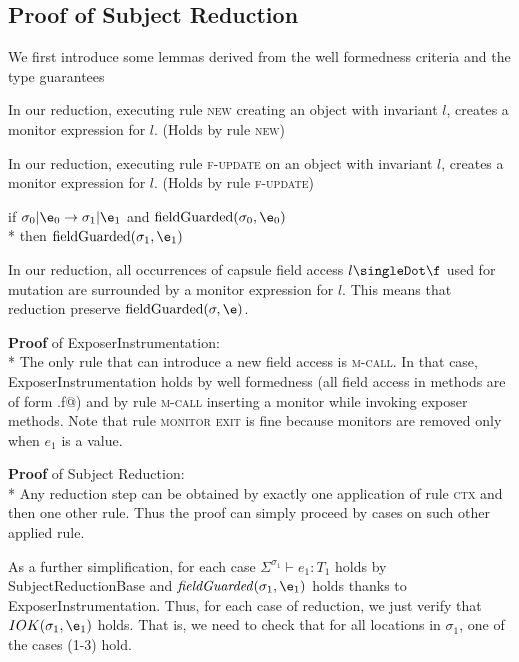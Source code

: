 \subsection{Proof of Subject Reduction}
We first introduce some lemmas
derived from the well formedness criteria and the type guarantees
\begin{Lemma}[ConstructorInstrumentation]
  In our reduction, executing rule \textsc{new} creating an object with invariant $l$, creates a monitor expression for $l$.
(Holds by rule \textsc{new})
\end{Lemma}
\begin{Lemma}[SetterInstrumentation]
  In our reduction, executing rule \textsc{f-update} on an object with invariant $l$, creates a monitor expression for $l$.
(Holds by rule \textsc{f-update})
\end{Lemma}
\begin{Lemma}[ExposerInstrumentation]
if $\sigma_0 | \e_0\rightarrow \sigma_1 |\e_1$ and
$\text{fieldGuarded}(\sigma_0,\e_0)$
\\*
then $\text{fieldGuarded}(\sigma_1,\e_1)$

  In our reduction, all occurrences of capsule field access $l\singleDot\f$ used for mutation
   are surrounded by a monitor expression for $l$.
  This means that reduction preserve $\text{fieldGuarded}(\sigma,\e)$.
\end{Lemma}
\noindent\textbf{Proof }of ExposerInstrumentation:\\*
The only rule that can 
introduce a new field access is \textsc{m-call}.
In that case, ExposerInstrumentation holds
by well formedness (all field access in methods are of form \Q@this.f@) 
and by rule \textsc{m-call} inserting a monitor while invoking exposer methods.
Note that rule \textsc{monitor exit} is fine because monitors are removed only when
 $e_1$ is a value.

\noindent\textbf{Proof }of Subject Reduction:\\*
Any reduction step can be obtained
by exactly one application of rule \textsc{ctx} and then one other rule.
Thus the proof can simply proceed by cases on such other applied rule.

As a further simplification, for each case 
$\Sigma^{\sigma_1}\vdash e_1: T_1$ holds by SubjectReductionBase
and 
$\mathit{fieldGuarded}(\sigma_1,\e_1)$ 
holds thanks to ExposerInstrumentation.
Thus, for each case of reduction, we just verify that $IOK(\sigma_1,\e_1)$ holds.
That is, we need to check that for all locations in $\sigma_1$, one of the cases (1-3) hold.


